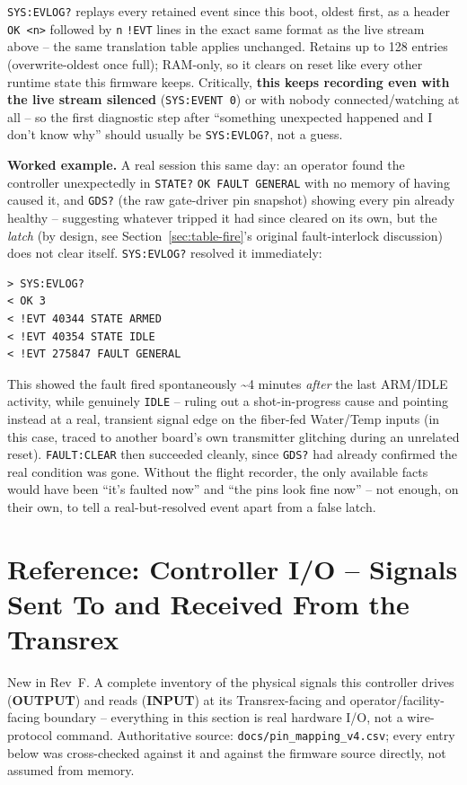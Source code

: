 \documentclass[11pt]{article}
\newcommand{\code}[1]{\texttt{#1}}
\begin{document}
\code{SYS:EVLOG?} replays every retained event since this boot, oldest
first, as a header \code{OK <n>} followed by \code{n} \code{!EVT}
lines in the exact same format as the live stream above -- the same
translation table applies unchanged. Retains up to 128 entries
(overwrite-oldest once full); RAM-only, so it clears on reset like
every other runtime state this firmware keeps. Critically, \textbf{this
keeps recording even with the live stream silenced} (\code{SYS:EVENT
0}) or with nobody connected/watching at all -- so the first
diagnostic step after ``something unexpected happened and I don't know
why'' should usually be \code{SYS:EVLOG?}, not a guess.

\textbf{Worked example.} A real session this same day: an operator
found the controller unexpectedly in \code{STATE?} \code{OK FAULT
GENERAL} with no memory of having caused it, and \code{GDS?} (the raw
gate-driver pin snapshot) showing every pin already healthy --
suggesting whatever tripped it had since cleared on its own, but the
\emph{latch} (by design, see Section~\ref{sec:table-fire}'s original
fault-interlock discussion) does not clear itself. \code{SYS:EVLOG?}
resolved it immediately:
\begin{verbatim}
> SYS:EVLOG?
< OK 3
< !EVT 40344 STATE ARMED
< !EVT 40354 STATE IDLE
< !EVT 275847 FAULT GENERAL
\end{verbatim}
This showed the fault fired spontaneously \textasciitilde{}4 minutes
\emph{after} the last ARM/IDLE activity, while genuinely \code{IDLE} --
ruling out a shot-in-progress cause and pointing instead at a real,
transient signal edge on the fiber-fed Water/Temp inputs (in this
case, traced to another board's own transmitter glitching during an
unrelated reset). \code{FAULT:CLEAR} then succeeded cleanly, since
\code{GDS?} had already confirmed the real condition was gone. Without
the flight recorder, the only available facts would have been ``it's
faulted now'' and ``the pins look fine now'' -- not enough, on their
own, to tell a real-but-resolved event apart from a false latch.

\section{Reference: Controller I/O -- Signals Sent To and Received From
the Transrex}
\label{sec:signals}

New in Rev~F. A complete inventory of the physical signals this
controller drives (\textbf{OUTPUT}) and reads (\textbf{INPUT}) at its
Transrex-facing and operator/facility-facing boundary -- everything in
this section is real hardware I/O, not a wire-protocol command.
Authoritative source: \code{docs/pin\_mapping\_v4.csv}; every entry
below was cross-checked against it and against the firmware source
directly, not assumed from memory.
\end{document}

